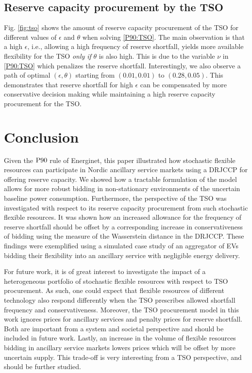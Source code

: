 \documentclass[conference]{IEEEtran}
\begin{document}
\subsection{Reserve capacity procurement by the \ac{TSO}}\label{sec:motivation}
\vspace{-1mm}
Fig. \ref{fig:tso} shows the amount of reserve capacity procurement of the \ac{TSO} for different values of $\epsilon$ and $\theta$ when solving \eqref{P90:TSO}. The main observation is that a high $\epsilon$, i.e., allowing a high frequency of reserve shortfall, yields more available flexibility for the \ac{TSO} \textit{only if} $\theta$ is also high. This is due to the variable $\nu$ in \eqref{P90:TSO} which penalizes the reserve shortfall. Interestingly, we also observe a path of optimal $(\epsilon, \theta)$ starting from $(0.01, 0.01)$ to $(0.28, 0.05)$. This demonstrates that reserve shortfall for high $\epsilon$ can be compensated by more conservative decision making while maintaining a high reserve capacity procurement for the \ac{TSO}.


\vspace{2mm}
\section{Conclusion}
\vspace{-1mm}
Given the $\rm{P90}$ rule of Energinet, this paper illustrated how stochastic flexible resources can participate in Nordic ancillary service markets using a \ac{DRJCCP} for offering reserve capacity. We showed how a tractable formulation of the model allows for more robust bidding in non-stationary environments of the uncertain baseline power consumption. Furthermore, the perspective of the \ac{TSO} was investigated with respect to its reserve capacity procurement from such stochastic flexible resources. It was shown how an increased allowance for the frequency of reserve shortfall should be offset by a corresponding increase in conservativeness of bidding using the measure of the Wasserstein distance in the \ac{DRJCCP}. These findings were exemplified using a simulated case study of an aggregator of \acp{EV} bidding their flexibility into an ancillary service with negligible energy delivery.

For future work, it is of great interest to investigate the impact of a heterogeneous portfolio of stochastic flexible resources with respect to \ac{TSO} procurement. As such, one could expect that flexible resources of different technology also respond differently when the \ac{TSO} prescribes allowed shortfall frequency and conservativeness. Moreover, the \ac{TSO} procurement model in this work ignores prices for ancillary services and penalty prices for reserve shortfall. Both are important from a system and societal perspective and should be included in future work. Lastly, an increase in the volume of flexible resources bidding in ancillary service markets lowers prices which will be offset by more uncertain supply. This trade-off is very interesting from a \ac{TSO} perspective, and should be  further studied.
\end{document}
